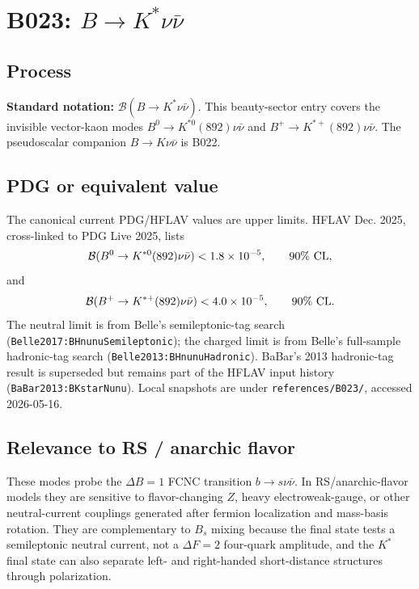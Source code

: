 
\section{B023: \(B\to K^*\nu\bar{\nu}\)}

\subsection*{Process}
\textbf{Standard notation:} \(\mathcal{B}(B\to K^*\nu\bar{\nu})\).
This beauty-sector entry covers the invisible vector-kaon modes
\(B^0\to K^{*0}(892)\nu\bar{\nu}\) and
\(B^+\to K^{*+}(892)\nu\bar{\nu}\).  The pseudoscalar companion
\(B\to K\nu\bar{\nu}\) is B022.

\subsection*{PDG or equivalent value}
The canonical current PDG/HFLAV values are upper limits.  HFLAV Dec. 2025,
cross-linked to PDG Live 2025, lists
\[
  \mathcal{B}(B^0\to K^{*0}(892)\nu\bar{\nu}) < 1.8\times 10^{-5},
  \qquad 90\%~{\rm CL},
\]
and
\[
  \mathcal{B}(B^+\to K^{*+}(892)\nu\bar{\nu}) < 4.0\times 10^{-5},
  \qquad 90\%~{\rm CL}.
\]
The neutral limit is from Belle's semileptonic-tag search
(\texttt{Belle2017:BHnunuSemileptonic}); the charged limit is from Belle's
full-sample hadronic-tag search (\texttt{Belle2013:BHnunuHadronic}).  BaBar's
2013 hadronic-tag result is superseded but remains part of the HFLAV input
history (\texttt{BaBar2013:BKstarNunu}).  Local snapshots are under
\texttt{references/B023/}, accessed 2026-05-16.

\subsection*{Relevance to RS / anarchic flavor}
These modes probe the \(\Delta B=1\) FCNC transition \(b\to s\nu\bar{\nu}\).
In RS/anarchic-flavor models they are sensitive to flavor-changing \(Z\),
heavy electroweak-gauge, or other neutral-current couplings generated after
fermion localization and mass-basis rotation.  They are complementary to
\(B_s\) mixing because the final state tests a semileptonic neutral current,
not a \(\Delta F=2\) four-quark amplitude, and the \(K^*\) final state can also
separate left- and right-handed short-distance structures through polarization.

